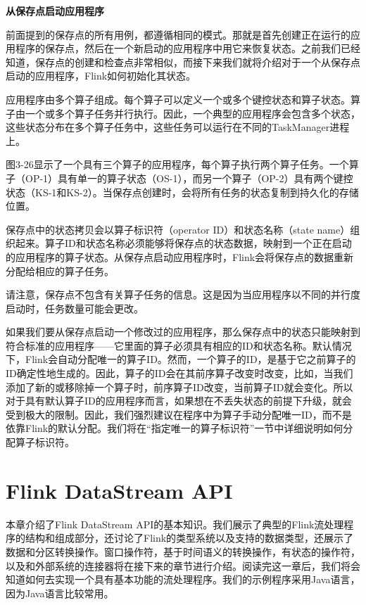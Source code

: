 \documentclass[cn,11pt,chinese]{elegantbook}
\renewenvironment{quote}{\begin{customblockquote}\list{}{\rightmargin=0em\leftmargin=0em}%
\item\relax\color{blockquote-text}\ignorespaces}{\unskip\unskip\endlist\end{customblockquote}}
\begin{document}
\textbf{从保存点启动应用程序}

前面提到的保存点的所有用例，都遵循相同的模式。那就是首先创建正在运行的应用程序的保存点，然后在一个新启动的应用程序中用它来恢复状态。之前我们已经知道，保存点的创建和检查点非常相似，而接下来我们就将介绍对于一个从保存点启动的应用程序，Flink如何初始化其状态。

应用程序由多个算子组成。每个算子可以定义一个或多个键控状态和算子状态。算子由一个或多个算子任务并行执行。因此，一个典型的应用程序会包含多个状态，这些状态分布在多个算子任务中，这些任务可以运行在不同的TaskManager进程上。

图3-26显示了一个具有三个算子的应用程序，每个算子执行两个算子任务。一个算子（OP-1）具有单一的算子状态（OS-1），而另一个算子（OP-2）具有两个键控状态（KS-1和KS-2）。当保存点创建时，会将所有任务的状态复制到持久化的存储位置。

保存点中的状态拷贝会以算子标识符（operator ID）和状态名称（state
name）组织起来。算子ID和状态名称必须能够将保存点的状态数据，映射到一个正在启动的应用程序的算子状态。从保存点启动应用程序时，Flink会将保存点的数据重新分配给相应的算子任务。

\begin{quote}
请注意，保存点不包含有关算子任务的信息。这是因为当应用程序以不同的并行度启动时，任务数量可能会更改。
\end{quote}

如果我们要从保存点启动一个修改过的应用程序，那么保存点中的状态只能映射到符合标准的应用程序------它里面的算子必须具有相应的ID和状态名称。默认情况下，Flink会自动分配唯一的算子ID。然而，一个算子的ID，是基于它之前算子的ID确定性地生成的。因此，算子的ID会在其前序算子改变时改变，比如，当我们添加了新的或移除掉一个算子时，前序算子ID改变，当前算子ID就会变化。所以对于具有默认算子ID的应用程序而言，如果想在不丢失状态的前提下升级，就会受到极大的限制。因此，我们强烈建议在程序中为算子手动分配唯一ID，而不是依靠Flink的默认分配。我们将在``指定唯一的算子标识符''一节中详细说明如何分配算子标识符。

\hypertarget{flink-datastream-api}{%
\chapter{Flink DataStream API}\label{flink-datastream-api}}

本章介绍了Flink DataStream
API的基本知识。我们展示了典型的Flink流处理程序的结构和组成部分，还讨论了Flink的类型系统以及支持的数据类型，还展示了数据和分区转换操作。窗口操作符，基于时间语义的转换操作，有状态的操作符，以及和外部系统的连接器将在接下来的章节进行介绍。阅读完这一章后，我们将会知道如何去实现一个具有基本功能的流处理程序。我们的示例程序采用Java语言，因为Java语言比较常用。
\end{document}

